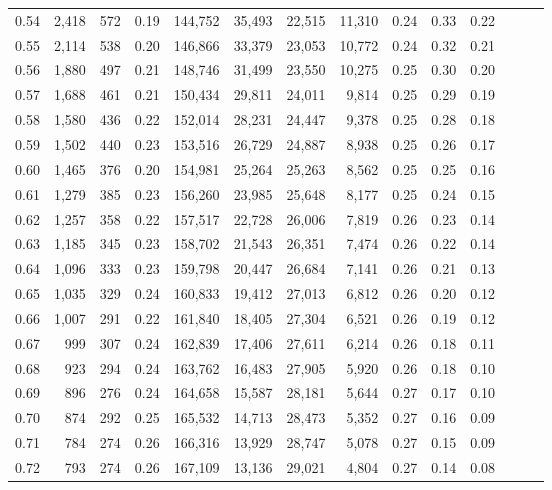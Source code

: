 \begin{tabular}{rrrrrrrrrrrrrr}
0.54 &  2,418 &  572 &  0.19 &  144,752 &   35,493 &  22,515 &  11,310 &  0.24 &  0.33 &      0.22 \\
0.55 &  2,114 &  538 &  0.20 &  146,866 &   33,379 &  23,053 &  10,772 &  0.24 &  0.32 &      0.21 \\
0.56 &  1,880 &  497 &  0.21 &  148,746 &   31,499 &  23,550 &  10,275 &  0.25 &  0.30 &      0.20 \\
0.57 &  1,688 &  461 &  0.21 &  150,434 &   29,811 &  24,011 &   9,814 &  0.25 &  0.29 &      0.19 \\
0.58 &  1,580 &  436 &  0.22 &  152,014 &   28,231 &  24,447 &   9,378 &  0.25 &  0.28 &      0.18 \\
0.59 &  1,502 &  440 &  0.23 &  153,516 &   26,729 &  24,887 &   8,938 &  0.25 &  0.26 &      0.17 \\
0.60 &  1,465 &  376 &  0.20 &  154,981 &   25,264 &  25,263 &   8,562 &  0.25 &  0.25 &      0.16 \\
0.61 &  1,279 &  385 &  0.23 &  156,260 &   23,985 &  25,648 &   8,177 &  0.25 &  0.24 &      0.15 \\
0.62 &  1,257 &  358 &  0.22 &  157,517 &   22,728 &  26,006 &   7,819 &  0.26 &  0.23 &      0.14 \\
0.63 &  1,185 &  345 &  0.23 &  158,702 &   21,543 &  26,351 &   7,474 &  0.26 &  0.22 &      0.14 \\
0.64 &  1,096 &  333 &  0.23 &  159,798 &   20,447 &  26,684 &   7,141 &  0.26 &  0.21 &      0.13 \\
0.65 &  1,035 &  329 &  0.24 &  160,833 &   19,412 &  27,013 &   6,812 &  0.26 &  0.20 &      0.12 \\
0.66 &  1,007 &  291 &  0.22 &  161,840 &   18,405 &  27,304 &   6,521 &  0.26 &  0.19 &      0.12 \\
0.67 &    999 &  307 &  0.24 &  162,839 &   17,406 &  27,611 &   6,214 &  0.26 &  0.18 &      0.11 \\
0.68 &    923 &  294 &  0.24 &  163,762 &   16,483 &  27,905 &   5,920 &  0.26 &  0.18 &      0.10 \\
0.69 &    896 &  276 &  0.24 &  164,658 &   15,587 &  28,181 &   5,644 &  0.27 &  0.17 &      0.10 \\
0.70 &    874 &  292 &  0.25 &  165,532 &   14,713 &  28,473 &   5,352 &  0.27 &  0.16 &      0.09 \\
0.71 &    784 &  274 &  0.26 &  166,316 &   13,929 &  28,747 &   5,078 &  0.27 &  0.15 &      0.09 \\
0.72 &    793 &  274 &  0.26 &  167,109 &   13,136 &  29,021 &   4,804 &  0.27 &  0.14 &      0.08 \\

\end{tabular}
